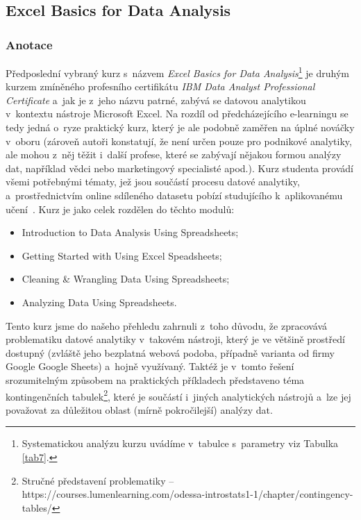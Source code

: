 \hypertarget{excel-basics-for-data-analysis}{%
\subsection{Excel Basics for Data Analysis}\label{excel-basics-for-data-analysis}}

\hypertarget{anotace-5}{%
\subsubsection{Anotace}\label{anotace-5}}

Předposlední vybraný kurz s~názvem \emph{Excel Basics for Data Analysis}\footnote{Systematickou analýzu kurzu uvádíme v~tabulce s~parametry viz Tabulka \ref{tab7}.} je druhým kurzem zmíněného profesního certifikátu \emph{IBM Data Analyst Professional Certificate} a~jak je z~jeho názvu patrné, zabývá se datovou analytikou v~kontextu nástroje Microsoft Excel. Na rozdíl od předcházejícího e-learningu se tedy jedná o~ryze praktický kurz, který je ale podobně zaměřen na úplné nováčky v~oboru (zároveň autoři konstatují, že není určen pouze pro podnikové analytiky, ale mohou z~něj těžit i~další profese, které se zabývají nějakou formou analýzy dat, například vědci nebo marketingový specialisté apod.). Kurz studenta provádí všemi potřebnými tématy, jež jsou součástí procesu datové analytiky, a~prostřednictvím online sdíleného datasetu pobízí studujícího k~aplikovanému učení~\parencite{course7}. Kurz je jako celek rozdělen do těchto modulů:

\begin{itemize}
\tightlist
\item
  Introduction to Data Analysis Using Spreadsheets;
\item
  Getting Started with Using Excel Speadsheets;
\item
  Cleaning \& Wrangling Data Using Spreadsheets;
\item
  Analyzing Data Using Spreadsheets.
\end{itemize}

Tento kurz jsme do našeho přehledu zahrnuli z~toho důvodu, že zpracovává problematiku datové analytiky v~takovém nástroji, který je ve většině prostředí dostupný (zvláště jeho bezplatná webová podoba, případně varianta od firmy Google Google Sheets) a~hojně využívaný. Taktéž je v~tomto řešení srozumitelným způsobem na praktických příkladech představeno téma kontingenčních tabulek\footnote{Stručné představení problematiky – https://courses.lumenlearning.com/odessa-introstats1-1/chapter/contingency-tables/}, které je součástí i~jiných analytických nástrojů a~lze jej považovat za důležitou oblast (mírně pokročilejší) analýzy dat.

